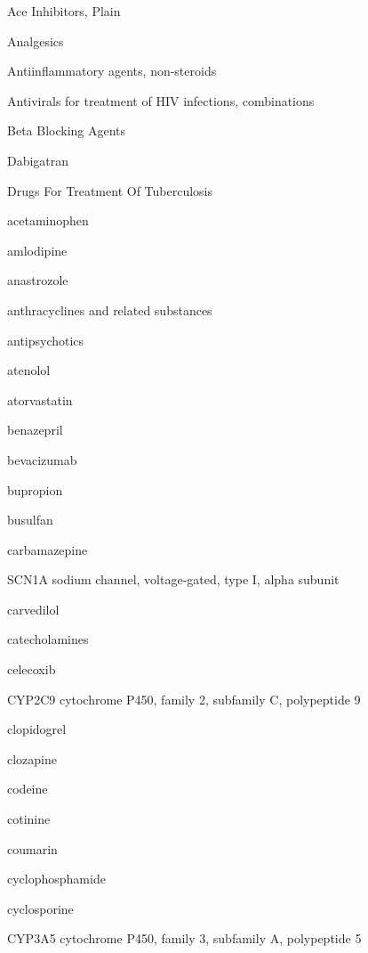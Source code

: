 \documentclass{resume} %
\begin{document}
\begin{rSection}{ Ace Inhibitors, Plain }
\begin{rSection}{ Analgesics }
\begin{rSection}{ Antiinflammatory agents, non-steroids }
\begin{rSection}{ Antivirals for treatment of HIV infections, combinations }
\begin{rSection}{ Beta Blocking Agents }
\begin{rSection}{ Dabigatran }
\begin{rSection}{ Drugs For Treatment Of Tuberculosis }
\begin{rSection}{ acetaminophen }
\begin{rSection}{ amlodipine }
\begin{rSection}{ anastrozole }
\begin{rSection}{ anthracyclines and related substances }
\begin{rSection}{ antipsychotics }
\begin{rSection}{ atenolol }
\begin{rSection}{ atorvastatin }
\begin{rSection}{ benazepril }
\begin{rSection}{ bevacizumab }
\begin{rSection}{ bupropion }
\begin{rSection}{ busulfan }
\begin{rSection}{ carbamazepine }
\begin{rSubsection}{ SCN1A }{ sodium channel, voltage-gated, type I, alpha subunit }{}{}
\end{rSubsection}
\end{rSection}\begin{rSection}{ carvedilol }
\item[]
\begin{rSection}{ catecholamines }
\item[]
\begin{rSection}{ celecoxib }
\item[]
\begin{rSubsection}{ CYP2C9 }{ cytochrome P450, family 2, subfamily C, polypeptide 9 }{}{}
\item[]

\end{rSubsection}
\end{rSection}\begin{rSection}{ clopidogrel }
\item[]
\begin{rSection}{ clozapine }
\item[]
\begin{rSection}{ codeine }
\item[]
\begin{rSection}{ cotinine }
\item[]
\begin{rSection}{ coumarin }
\item[]
\begin{rSection}{ cyclophosphamide }
\item[]
\begin{rSection}{ cyclosporine }
\item[]
\begin{rSubsection}{ CYP3A5 }{ cytochrome P450, family 3, subfamily A, polypeptide 5 }{}{}
\item[]


\end{rSubsection}
\end{rSection}
\end{rSection}
\end{rSection}
\end{rSection}
\end{rSection}
\end{rSection}
\end{rSection}
\end{rSection}
\end{rSection}
\end{rSection}
\end{rSection}
\end{rSection}
\end{rSection}
\end{rSection}
\end{rSection}
\end{rSection}
\end{rSection}
\end{rSection}
\end{rSection}
\end{rSection}
\end{rSection}
\end{rSection}
\end{rSection}
\end{rSection}
\end{rSection}
\end{rSection}
\end{rSection}
\end{document}
